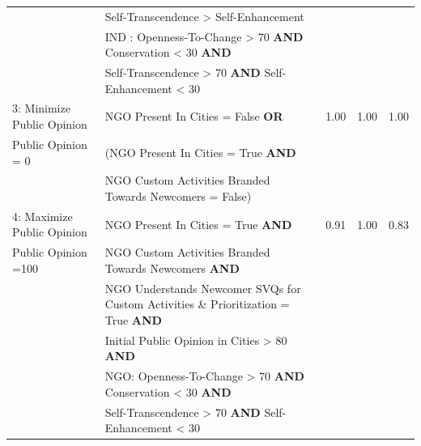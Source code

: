 \documentclass{scspaperproc}
\theoremstyle{scsthe}
\begin{document}
\begin{table}[ht]
\begin{center}
{\begin{tabular}{|l l l l l |}
                                                                      & \hspace*{0.95cm} Self-Transcendence > Self-Enhancement  & & & \\    
                                                                      &  IND : Openness-To-Change > 70 \textbf{AND} Conservation < 30 \textbf{AND} & & & \\
                                                                      & \hspace*{0.95cm} Self-Transcendence > 70 \textbf{AND} Self-Enhancement < 30 & & & \\                                                                                                                                                                                              
 \hline
3: Minimize Public Opinion                                                                                       &     NGO Present In Cities  = False  \textbf{OR}   & 1.00 & 1.00 & 1.00   \\
\hspace*{0.25 cm} Public Opinion = 0 & (NGO Present In Cities  = True \textbf{AND} & & & \\
                                                            & NGO Custom Activities Branded Towards Newcomers = False)  & & & \\
\hline
4: Maximize Public Opinion                                                                                       &     NGO Present In Cities  = True  \textbf{AND}   & 0.91 & 1.00 & 0.83   \\
\hspace*{0.25cm} Public Opinion =100 & NGO Custom Activities Branded Towards Newcomers \textbf{AND} & & & \\
                                                                      & NGO Understands Newcomer SVQs for Custom Activities \& Prioritization = True \textbf{AND} & &  & \\
                                                                      & Initial Public Opinion in Cities > 80 \textbf{AND} & & & \\  
                                                                      & NGO: Openness-To-Change > 70 \textbf{AND} Conservation < 30 \textbf{AND} & & & \\         
                                                                      & \hspace*{0.95cm} Self-Transcendence > 70 \textbf{AND} Self-Enhancement < 30 & & & \\ 

\end{tabular}}
\end{center}
\end{table}
\end{document}
